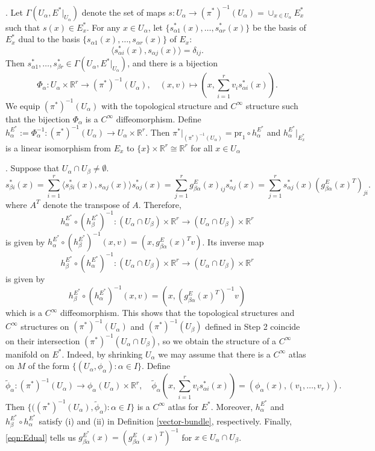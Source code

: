 \documentclass{amsart}
\numberwithin{equation}{section}
\newcommand{\bR}{\mathbb{R}}
\theoremstyle{definition}
\theoremstyle{theorem}
\begin{document}
. Let $\Gamma(U_\alpha, E^*|_{U_\alpha})$ denote the
set of maps $s: U_\alpha \to (\pi^*)^{-1}(U_\alpha)= \cup_{x \in U_\alpha} E^*_x$ such that
$s(x)\in E^*_x$. For any $x\in U_\alpha$, let
$\{s_{\alpha 1}^*(x),\ldots, s_{\alpha r}^*(x)\}$  be the basis of $E^*_x$ dual to
the basis $\{s_{\alpha 1}(x),\ldots, s_{\alpha r}(x)\}$ of $E_x$:
$$
\langle s_{\alpha i}^*(x),s_{\alpha j}(x)\rangle = \delta_{ij}.
$$ 
Then $s_{\alpha 1}^*,\ldots, s_{\beta r}^* \in \Gamma(U_\alpha, E^*|_{U_\alpha})$, and there is a bijection 
$$
\Phi_\alpha: U_\alpha\times \bR^r \to (\pi^*)^{-1}(U_\alpha),\quad
(x,v)\mapsto (x, \sum_{i=1}^r v_i s_{\alpha i}^*(x)). 
$$
We equip $(\pi^*)^{-1}(U_\alpha)$ with the topological structure and $C^\infty$ structure
such that the bijection $\Phi_\alpha$ is a $C^\infty$ diffeomorphism. Define
$h^{E^*}_\alpha:=\Phi_\alpha^{-1}: (\pi^*)^{-1}(U_\alpha)\to U_\alpha \times \bR^r$.
Then $\pi^*|_{(\pi^*)^{-1}(U_\alpha)} = \mathrm{pr}_1\circ h^{E^*}_\alpha$ and
$h^{E^*}_\alpha|_{E^*_x}$ is a linear isomorphism from $E_x$ to $\{x\}\times \bR^r \cong \bR^r$ 
for all $x\in U_\alpha$

. Suppose that  $U_\alpha \cap U_\beta \neq \emptyset$.
$$
s_{\beta i}^*(x) =\sum_{i=1}^r \langle s_{\beta i}^*(x), s_{\alpha j}(x)\rangle s_{\alpha j}^*(x)
=\sum_{j=1}^r g_{\beta\alpha}^{E}(x)_{ij} s_{\alpha j}^*(x) = \sum_{j=1}^r s_{\alpha j}^*(x) \left(g_{\beta\alpha}^{E}(x)^T \right)_{ji}. 
$$
where $A^T$ denote the transpose of $A$. Therefore,
$$
h^{E^*}_\alpha\circ (h^{E^*}_\beta)^{-1}: (U_\alpha\cap U_\beta)\times\bR^r
\to (U_\alpha\cap U_\beta)\times \bR^r
$$
is given by $h^{E^*}_\alpha\circ (h^{E^*}_\beta)^{-1}(x,v)= (x, g^E_{\beta\alpha}(x)^T v)$. Its inverse
map 
$$
h^{E^*}_\beta \circ (h^{E^*}_\alpha)^{-1}: (U_\alpha\cap U_\beta)\times\bR^r
\to (U_\alpha\cap U_\beta)\times \bR^r
$$
is given by 
\begin{equation}\label{eqn:Edual}
h^{E^*}_\beta \circ (h^{E^*}_\alpha)^{-1}(x,v)= (x, (g^E_{\beta\alpha}(x)^T)^{-1} v)
\end{equation}
which is a $C^\infty$ diffeomorphism. This shows that the topological structures and $C^\infty$ structures on $(\pi^*)^{-1}(U_\alpha)$ and $(\pi^*)^{-1}(U_\beta)$ defined in Step 2 
coincide on their intersection $(\pi^*)^{-1}(U_\alpha\cap U_\beta)$, so we obtain 
the structure of a $C^\infty$ manifold on $E^*$.
Indeed, by shrinking $U_\alpha$ we may assume that there is a $C^\infty$  atlas on $M$
of the form $\{ (U_\alpha, \phi_\alpha): \alpha\in I\}$.
Define 
$$
\tilde{\phi}_\alpha:(\pi^*)^{-1}(U_\alpha)\to \phi_\alpha(U_\alpha) \times \bR^r,
\quad \tilde{\phi}_\alpha(x,\sum_{i=1}^r v_i s^*_{\alpha i}(x)) = (\phi_\alpha(x), (v_1,\ldots, v_r)).
$$ 
Then  $\{ \Big((\pi^*)^{-1}(U_\alpha), \tilde{\phi}_\alpha\Big):\alpha\in I\}$ is
a $C^\infty$ atlas for $E^*$. Moreover, $h_\alpha^{E^*}$ and 
$h_\beta^{E^*}\circ h_\alpha^{E^*}$ satisfy 
(i) and (ii) in Definition \ref{vector-bundle}, respectively.
Finally, \eqref{eqn:Edual} tells us
$g^{E^*}_{\beta \alpha}(x)= (g^E_{\beta \alpha}(x)^T)^{-1}$ for $x\in U_\alpha\cap U_\beta$.
\end{document}
